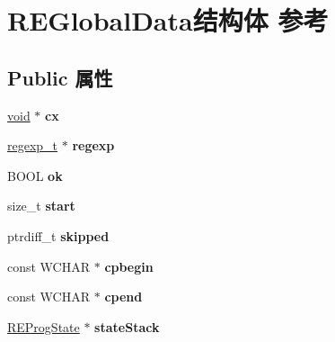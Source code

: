 \hypertarget{struct_r_e_global_data}{}\section{R\+E\+Global\+Data结构体 参考}
\label{struct_r_e_global_data}
\subsection*{Public 属性}
\begin{DoxyCompactItemize}
\item 
\mbox{\label{struct_r_e_global_data_ae4ca87df88fd2e616a763f99f8e264fc}} 
\hyperlink{interfacevoid}{void} $\ast$ {\bfseries cx}
\item 
\mbox{\label{struct_r_e_global_data_a72b4a7b7b84b9833e7935ee715f55196}} 
\hyperlink{structregexp__t}{regexp\+\_\+t} $\ast$ {\bfseries regexp}
\item 
\mbox{\label{struct_r_e_global_data_aad1e179057dc5b2d234156216b2ce34f}} 
B\+O\+OL {\bfseries ok}
\item 
\mbox{\label{struct_r_e_global_data_a019fc44ad2543a00e344c4246f13ba1e}} 
size\+\_\+t {\bfseries start}
\item 
\mbox{\label{struct_r_e_global_data_ac973c048e6534eb542022e47b66e169b}} 
ptrdiff\+\_\+t {\bfseries skipped}
\item 
\mbox{\label{struct_r_e_global_data_a130f48ef9d415e7382e5c4e1b96a0fc2}} 
const W\+C\+H\+AR $\ast$ {\bfseries cpbegin}
\item 
\mbox{\label{struct_r_e_global_data_a2a36eaf33aa8071fd63b791cf587bbb5}} 
const W\+C\+H\+AR $\ast$ {\bfseries cpend}
\item 
\mbox{\label{struct_r_e_global_data_a61979564f36e010acb619a193fee5fee}} 
\hyperlink{struct_r_e_prog_state}{R\+E\+Prog\+State} $\ast$ {\bfseries state\+Stack}
\item 
\mbox{\label{struct_r_e_global_data_ab01804d8cfa32e1dd16a3f63cfcf5196}} 

\end{DoxyCompactItemize}
